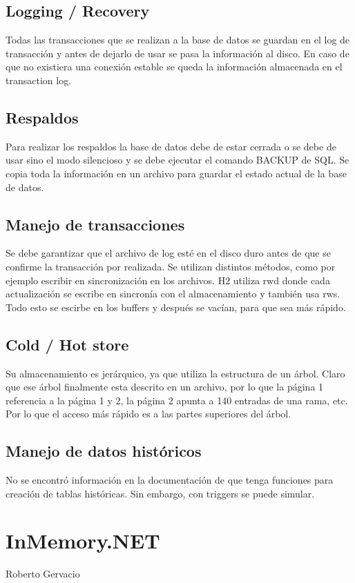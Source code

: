 \documentclass{acmart}
\begin{document}
\subsection{Logging / Recovery}
Todas las transacciones que se realizan a la base de datos se guardan en el log de transacción y antes de dejarlo de usar se pasa la información al disco. En caso de que no existiera una conexión estable se queda la información almacenada en el transaction log. 

\subsection{Respaldos}
Para realizar los respaldos la base de datos debe de estar cerrada o se debe de usar sino el modo silencioso y se debe ejecutar el comando BACKUP de SQL. Se copia toda la información en un archivo para guardar el estado actual de la base de datos.  

\subsection{Manejo de transacciones}
Se debe garantizar que el archivo de log esté en el disco duro antes de que se confirme la transacción por realizada. Se utilizan distintos métodos, como por ejemplo escribir en sincronización en los archivos. H2 utiliza rwd donde cada actualización se escribe en sincronía con el almacenamiento y también usa rws. Todo esto se escirbe en los buffers y después se vacían, para que sea más rápido. 

\subsection{Cold / Hot store}
Su almacenamiento es jerárquico, ya que utiliza la estructura de un árbol. Claro que ese árbol finalmente esta descrito en un archivo, por lo que la página 1 referencia a la página 1 y 2, la página 2 apunta a 140 entradas de una rama, etc. Por lo que el acceso más rápido es a las partes superiores del árbol. 

\subsection{Manejo de datos históricos}
No se encontró información en la documentación de que tenga funciones para creación de tablas históricas.  Sin embargo, con triggers se puede simular. 


\newpage

\section{InMemory.NET}
Roberto Gervacio
\end{document}
